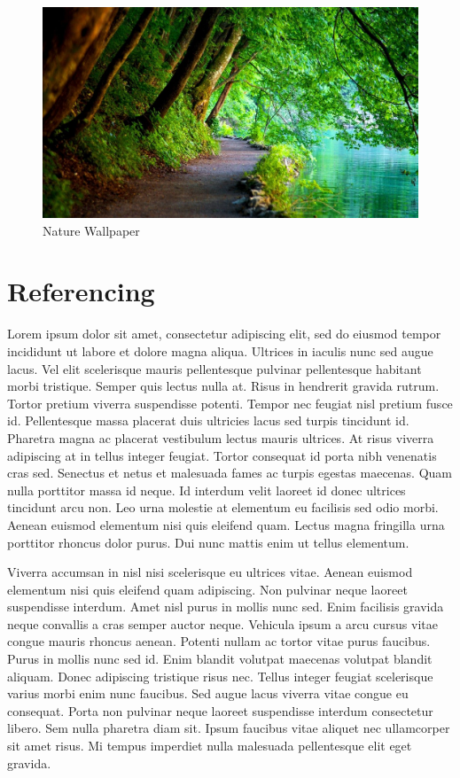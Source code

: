 \documentclass[a4paper, 12pt]{report}
\begin{document}
\begin{figure}[h] %
	\includegraphics[width=\textwidth]{sample_img2}
	\caption{Nature Wallpaper}
	\label{fig:sample_img2}
	\centering
\end{figure}




\chapter{Referencing}
Lorem ipsum dolor sit amet, consectetur adipiscing elit, sed do eiusmod tempor incididunt ut labore et dolore magna aliqua. Ultrices in iaculis nunc sed augue lacus. Vel elit scelerisque mauris pellentesque pulvinar pellentesque habitant morbi tristique. Semper quis lectus nulla at. Risus in hendrerit gravida rutrum. Tortor pretium viverra suspendisse potenti. Tempor nec feugiat nisl pretium fusce id. Pellentesque massa placerat duis ultricies lacus sed turpis tincidunt id. Pharetra magna ac placerat vestibulum lectus mauris ultrices. At risus viverra adipiscing at in tellus integer feugiat. Tortor consequat id porta nibh venenatis cras sed. Senectus et netus et malesuada fames ac turpis egestas maecenas. Quam nulla porttitor massa id neque. Id interdum velit laoreet id donec ultrices tincidunt arcu non. Leo urna molestie at elementum eu facilisis sed odio morbi. Aenean euismod elementum nisi quis eleifend quam. Lectus magna fringilla urna porttitor rhoncus dolor purus. Dui nunc mattis enim ut tellus elementum. \citep{4160265}

Viverra accumsan in nisl nisi scelerisque eu ultrices vitae. Aenean euismod elementum nisi quis eleifend quam adipiscing. Non pulvinar neque laoreet suspendisse interdum. Amet nisl purus in mollis nunc sed. Enim facilisis gravida neque convallis a cras semper auctor neque. Vehicula ipsum a arcu cursus vitae congue mauris rhoncus aenean. Potenti nullam ac tortor vitae purus faucibus. Purus in mollis nunc sed id. Enim blandit volutpat maecenas volutpat blandit aliquam. Donec adipiscing tristique risus nec. Tellus integer feugiat scelerisque varius morbi enim nunc faucibus. Sed augue lacus viverra vitae congue eu consequat. Porta non pulvinar neque laoreet suspendisse interdum consectetur libero. Sem nulla pharetra diam sit. Ipsum faucibus vitae aliquet nec ullamcorper sit amet risus. Mi tempus imperdiet nulla malesuada pellentesque elit eget gravida.\citep{ibm}
\end{document}
